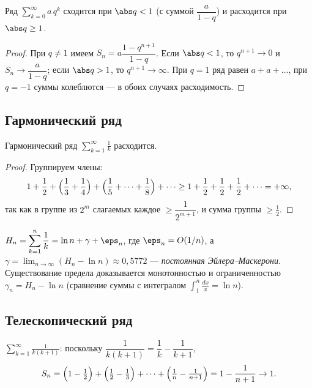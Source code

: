 \begin{theorem}
Ряд $\displaystyle\sum_{k=0}^{\infty}a\,q^k$ сходится при $\abs q<1$ (с суммой
$\dfrac{a}{1-q}$) и расходится при $\abs q\ge1$.
\end{theorem}

\begin{proof}
При $q\ne1$ имеем $S_n=a\dfrac{1-q^{n+1}}{1-q}$. Если $\abs q<1$, то $q^{n+1}\to0$ и
$S_n\to\dfrac{a}{1-q}$; если $\abs q>1$, то $q^{n+1}\to\infty$. При $q=1$ ряд равен $a+a+\dots$, при
$q=-1$ суммы колеблются — в обоих случаях расходимость.
\end{proof}

\subsection{Гармонический ряд}

\begin{theorem}
Гармонический ряд $\displaystyle\sum_{k=1}^{\infty}\frac1k$ расходится.
\end{theorem}

\begin{proof}
Группируем члены:
\[
  1+\frac12+\Bigl(\frac13+\frac14\Bigr)+\Bigl(\frac15+\dots+\frac18\Bigr)+\dots
   \ge 1+\frac12+\frac12+\frac12+\dots=+\infty,
\]
так как в группе из $2^{m}$ слагаемых каждое $\ge\dfrac1{2^{m+1}}$, и сумма группы $\ge\tfrac12$.
\end{proof}

\begin{remark}
$\displaystyle H_n=\sum_{k=1}^n\frac1k=\ln n+\gamma+\eps_n$, где $\eps_n=O(1/n)$, а
$\gamma=\displaystyle\lim_{n\to\infty}(H_n-\ln n)\approx0{,}5772$ — \emph{постоянная
Эйлера–Маскерони}. Существование предела доказывается монотонностью и ограниченностью
$\gamma_n=H_n-\ln n$ (сравнение суммы с интегралом $\int_1^n\frac{dx}{x}=\ln n$).
\end{remark}

\subsection{Телескопический ряд}

\begin{example}
$\displaystyle\sum_{k=1}^\infty\frac{1}{k(k+1)}$: поскольку $\dfrac{1}{k(k+1)}=\dfrac1k-\dfrac1{k+1}$,
\[
  S_n=\Bigl(1-\tfrac12\Bigr)+\Bigl(\tfrac12-\tfrac13\Bigr)+\dots+\Bigl(\tfrac1n-\tfrac1{n+1}\Bigr)
   =1-\frac1{n+1}\to1 .
\]
\end{example}

